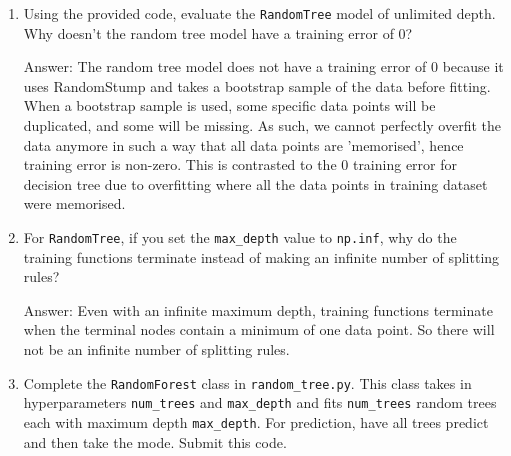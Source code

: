 \documentclass{article}
\def\ans#1{\par\gre{Answer: #1}}
\def\blu#1{{\color{blu}#1}}
\def\gre#1{{\color{gre}#1}}
\let\ask\blu
\begin{document}
   \begin{enumerate}
        \item Using the provided code, evaluate the \texttt{RandomTree} model of unlimited depth. \ask{Why doesn't the random tree model have a training error of 0?}
        \ans {The random tree model does not have a training error of 0 because it uses RandomStump and takes a bootstrap sample of the data before fitting. When a bootstrap sample is used, some specific data points will be duplicated, and some will be missing. As such, we cannot perfectly overfit the data anymore in such a way that all data points are 'memorised', hence training error is non-zero. This is contrasted to the 0 training error for decision tree due to overfitting where all the data points in training dataset were memorised.}

        \item For \texttt{RandomTree}, if you set the \texttt{max\_depth} value to \texttt{np.inf}, \ask{why do the training functions terminate instead of making an infinite number of splitting rules?}
        \ans {Even with an infinite maximum depth, training functions terminate when the terminal nodes contain a minimum of one data point. So there will not be an infinite number of splitting rules.}
        \item Complete the \texttt{RandomForest} class in \texttt{random\string_tree.py}. This class takes in hyperparameters \texttt{num\string_trees} and \texttt{max\string_depth} and
        fits \texttt{num\string_trees} random trees each with maximum depth \texttt{max\string_depth}. For prediction, have all trees predict and then take the mode. \ask{Submit this code.} \\

\end{enumerate}
\end{document}
